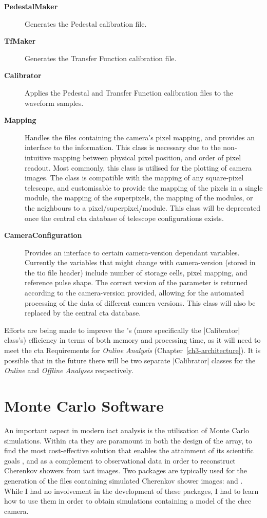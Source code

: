 \lstset{language=C++}
\begin{description}
\item [\textbf{PedestalMaker}] Generates the Pedestal calibration file.
\item [\textbf{TfMaker}] Generates the Transfer Function calibration file.
\item [\textbf{Calibrator}] Applies the Pedestal and Transfer Function calibration files to the waveform samples.
\item [\textbf{Mapping}] Handles the files containing the camera's pixel mapping, and provides an interface to the information. This class is necessary due to the non-intuitive mapping between physical pixel position, and order of pixel readout. Most commonly, this class is utilised for the plotting of camera images. The class is compatible with the mapping of any square-pixel telescope, and customisable to provide the mapping of the pixels in a single module, the mapping of the superpixels, the mapping of the modules, or the neighbours to a pixel/superpixel/module. This class will be deprecated once the central \gls{cta} database of telescope configurations exists.
\item [\textbf{CameraConfiguration}] Provides an interface to certain camera-version dependant variables. Currently the variables that might change with camera-version (stored in the \gls{tio} file header) include number of storage cells, pixel mapping, and reference pulse shape. The correct version of the parameter is returned according to the camera-version provided, allowing for the automated processing of the data of different camera versions. This class will also be replaced by the central \gls{cta} database.
\end{description}

Efforts are being made to improve the 's (more specifically the |Calibrator| class's) efficiency in terms of both memory and processing time, as it will need to meet the \gls{cta} Requirements for \textit{Online Analysis} (Chapter~\ref{ch3-architecture}). It is possible that in the future there will be two separate |Calibrator| classes for the \textit{Online} and \textit{Offline Analyses} respectively.

\section{Monte Carlo Software}

An important aspect in modern \gls{iact} analysis is the utilisation of Monte Carlo simulations. Within \gls{cta} they are paramount in both the design of the array, to find the most cost-effective solution that enables the attainment of its scientific goals \cite{Bernlohr2013a}, and as a complement to observational data in order to reconstruct Cherenkov showers from \gls{iact} images. Two packages are typically used for the generation of the files containing simulated Cherenkov shower images:  and . While I had no involvement in the development of these packages, I had to learn how to use them in order to obtain simulations containing a model of the \gls{chec} camera.

